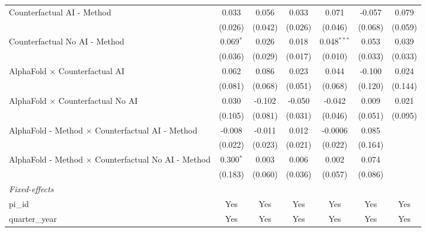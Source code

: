 \begin{tabular}{lcccccc}
   Counterfactual AI - Method                                 & 0.033       & 0.056        & 0.033        & 0.071         & -0.057      & 0.079\\   
                                                              & (0.026)     & (0.042)      & (0.026)      & (0.046)       & (0.068)     & (0.059)\\   
   Counterfactual No AI - Method                              & 0.069$^{*}$ & 0.026        & 0.018        & 0.048$^{***}$ & 0.053       & 0.039\\   
                                                              & (0.036)     & (0.029)      & (0.017)      & (0.010)       & (0.033)     & (0.033)\\   
   AlphaFold $\times$ Counterfactual AI                       & 0.062       & 0.086        & 0.023        & 0.044         & -0.100      & 0.024\\   
                                                              & (0.081)     & (0.068)      & (0.051)      & (0.068)       & (0.120)     & (0.144)\\   
   AlphaFold $\times$ Counterfactual No AI                    & 0.030       & -0.102       & -0.050       & -0.042        & 0.009       & 0.021\\   
                                                              & (0.105)     & (0.081)      & (0.031)      & (0.046)       & (0.051)     & (0.095)\\   
   AlphaFold - Method $\times$ Counterfactual AI - Method     & -0.008      & -0.011       & 0.012        & -0.0006       & 0.085       &   \\   
                                                              & (0.022)     & (0.023)      & (0.021)      & (0.022)       & (0.164)     &   \\   
   AlphaFold - Method $\times$ Counterfactual No AI - Method  & 0.300$^{*}$ & 0.003        & 0.006        & 0.002         & 0.074       &   \\   
                                                              & (0.183)     & (0.060)      & (0.036)      & (0.057)       & (0.086)     &   \\   
   \midrule
   \emph{Fixed-effects}\\
   pi\_id                                                     & Yes         & Yes          & Yes          & Yes           & Yes         & Yes\\  
   quarter\_year                                              & Yes         & Yes          & Yes          & Yes           & Yes         & Yes\\  

\end{tabular}
